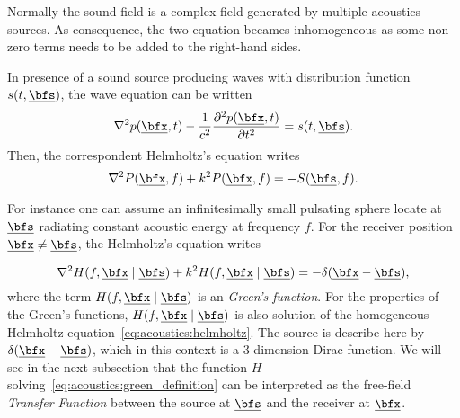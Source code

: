Normally the sound field is a complex field generated by multiple acoustics sources. As consequence, the two equation becames
inhomogeneous as some non-zero terms needs to be added to the right-hand sides.

In presence of a sound source producing waves with distribution function $s(t, \positionSource)$, the wave equation can be written
\begin{equation}
    \label{eq:acoustics:source}
    \knabla^2 \pressureSpaceTime - \frac{1}{\speedOfSound^2} \kpderiv[2]{\pressureSpaceTime}{t} = s(t, \positionSource)
    .
\end{equation}
Then, the correspondent Helmholtz's equation writes
\begin{equation}
    \label{eq:acoustics:source_freq}
    \knabla^2 P(\positionMicrophone, f) + k^2 P(\positionMicrophone, f) = - S(\positionSource, f)
    .
\end{equation}

For instance one can assume an infinitesimally small pulsating sphere locate at $\positionSource$ radiating constant acoustic energy at frequency $f$.
For the receiver position $\positionMicrophone \neq \positionSource$, the Helmholtz's equation writes

\begin{equation}
    \label{eq:acoustics:green_definition}
    \knabla^2 H(f, \positionMicrophone \mid \positionSource)
     + k^2 H(f, \positionMicrophone \mid \positionSource) = - \delta(\positionMicrophone - \positionSource)
    ,
\end{equation}
where the term $H(f, \positionMicrophone \mid \positionSource)$ is an \textit{Green's function}.
For the properties of the Green's functions, $H(f, \positionMicrophone \mid \positionSource)$ is also solution of the homogeneous Helmholtz equation~\ref{eq:acoustics:helmholtz}.
The source is describe here by $\delta(\positionMicrophone - \positionSource)$, which in this context is a 3-dimension Dirac function.
We will see in the next subsection that the function $H$ solving~\ref{eq:acoustics:green_definition} can be interpreted as the free-field \textit{Transfer Function}
between the source at $\positionSource$ and the receiver at $\positionMicrophone$.

